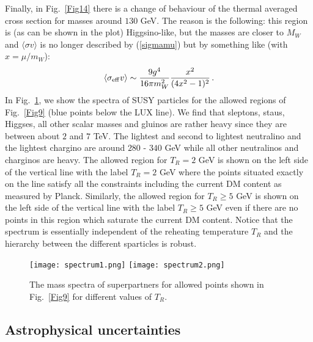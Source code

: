 \documentclass[11pt,a4paper]{article}
\newcommand{\be}{\begin{equation}}
\newcommand{\ee}{\end{equation}}
\begin{document}
\FloatBarrier

Finally, in Fig.~\ref{Fig14} there is a change of behaviour of the thermal averaged cross section for masses around $130$ GeV. The reason is the following: this region is (as can be shown in the plot) Higgsino-like, but the masses are closer to $M_W$ and  $\langle \sigma v \rangle$ is no longer described by (\ref{sigmamu}) but by something like (with $x=\mu/m_W$):
\be
\langle \sigma_{\rm eff} v \rangle \sim \frac{9g^4}{16 \pi m_W^2} \frac{x^2}{(4x^2-1)^2}\,.
\ee
In Fig.~\ref{Fig7a}, we show the spectra of SUSY particles for the allowed regions of Fig.~\ref{Fig9} (blue points below the LUX line). We find that sleptons, staus, Higgses, all other scalar masses and gluinos are rather heavy since they are between about $2$ and $7$ TeV. The lightest and second to lightest neutralino and the lightest chargino are around $280$ - $340$ GeV while all other neutralinos and charginos are heavy. The allowed region for $T_R=2$ GeV is shown on the left side of the vertical line with the label $T_R=2$ GeV where the points situated exactly on the line satisfy all the constraints including the current DM content as measured by Planck. Similarly, the allowed region for $T_R\geq 5$ GeV is shown on the left side of the vertical line with the label $T_R\geq 5$ GeV even if there are no points in this region which saturate the current DM content. Notice that the spectrum is essentially independent of the reheating temperature $T_R$ and the hierarchy between the different sparticles is robust.

\begin{figure}[!ht]
\centering
\texttt{[image: spectrum1.png]}
\texttt{[image: spectrum2.png]}
\caption{The mass spectra of superpartners for allowed points shown in Fig.~\ref{Fig9} for different values of $T_R$.}
\label{Fig7a}
\end{figure}

\FloatBarrier

\subsection{Astrophysical uncertainties}
\end{document}
